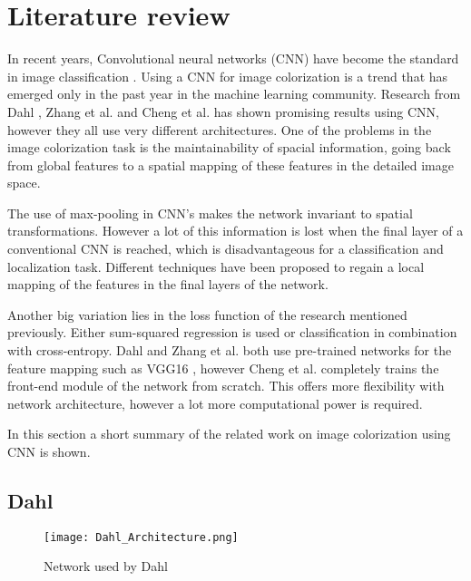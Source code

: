 \section{Literature review} \label{sec:litreview}


In recent years, Convolutional neural networks (CNN) have become the standard in image
classification \cite{Krizhevsky}. Using a CNN for image colorization is a trend that has emerged only in the past year in the machine learning community. Research from Dahl \cite{Dahl}, Zhang et al. \cite{Zhang}
and Cheng et al. \cite{Cheng} has shown promising results using CNN, however they all use very different
architectures. One of the problems in the image colorization task is the maintainability of spacial information, going back from global features to a spatial mapping of these features in the detailed image space. 

The use of max-pooling in CNN's makes the network invariant to spatial transformations. However a lot of this information is lost when the final layer of a conventional CNN is reached, which is disadvantageous for a classification and localization task. Different techniques have been proposed to regain a local mapping of the features in the final layers of the network. 

Another big variation lies in the loss function of the research mentioned previously. Either sum-squared regression is used or classification in combination with cross-entropy. Dahl \cite{Dahl} and Zhang et al. \cite{Zhang} both use pre-trained networks for the feature mapping such as VGG16 \cite{Simonyan}, however Cheng et al. \cite{Cheng} completely trains the front-end module of the network from scratch. This offers more flexibility with network architecture, however a lot more computational power is required. 

In this section a short summary of the related work on image colorization using CNN is shown.

\subsection{Dahl}

\begin{wrapfigure}{R}{0.39\textwidth}
	\vspace{-20pt}
	\begin{center}
		\texttt{[image: Dahl\_Architecture.png]}
	\end{center}
	\caption{Network used by Dahl \cite{Dahl}}
	\label{fig:dahlnetwork}
	\vspace{-10pt}
\end{wrapfigure}


